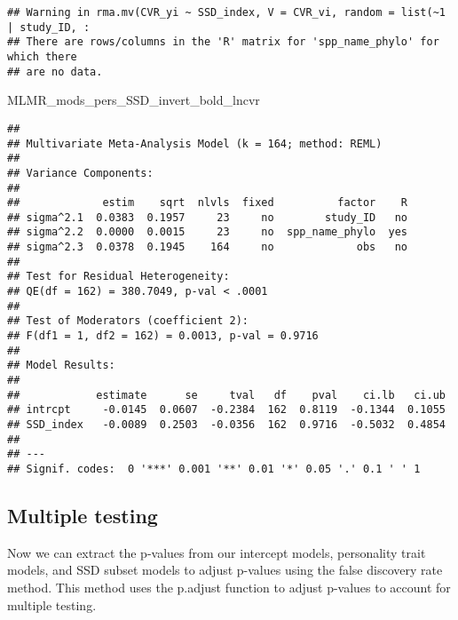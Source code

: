 \documentclass[]{article}
\newenvironment{Shaded}{\begin{snugshade}}{\end{snugshade}}
\newcommand{\NormalTok}[1]{#1}
\begin{document}
\begin{verbatim}
## Warning in rma.mv(CVR_yi ~ SSD_index, V = CVR_vi, random = list(~1 | study_ID, :
## There are rows/columns in the 'R' matrix for 'spp_name_phylo' for which there
## are no data.
\end{verbatim}

\begin{Shaded}
\begin{Highlighting}[]
\NormalTok{    MLMR_mods_pers_SSD_invert_bold_lncvr}
\end{Highlighting}
\end{Shaded}

\begin{verbatim}
## 
## Multivariate Meta-Analysis Model (k = 164; method: REML)
## 
## Variance Components:
## 
##             estim    sqrt  nlvls  fixed          factor    R 
## sigma^2.1  0.0383  0.1957     23     no        study_ID   no 
## sigma^2.2  0.0000  0.0015     23     no  spp_name_phylo  yes 
## sigma^2.3  0.0378  0.1945    164     no             obs   no 
## 
## Test for Residual Heterogeneity:
## QE(df = 162) = 380.7049, p-val < .0001
## 
## Test of Moderators (coefficient 2):
## F(df1 = 1, df2 = 162) = 0.0013, p-val = 0.9716
## 
## Model Results:
## 
##            estimate      se     tval   df    pval    ci.lb   ci.ub 
## intrcpt     -0.0145  0.0607  -0.2384  162  0.8119  -0.1344  0.1055    
## SSD_index   -0.0089  0.2503  -0.0356  162  0.9716  -0.5032  0.4854    
## 
## ---
## Signif. codes:  0 '***' 0.001 '**' 0.01 '*' 0.05 '.' 0.1 ' ' 1
\end{verbatim}

\subsection{Multiple testing}\label{multiple-testing}

Now we can extract the p-values from our intercept models, personality
trait models, and SSD subset models to adjust p-values using the false
discovery rate method. This method uses the p.adjust function to adjust
p-values to account for multiple testing.
\end{document}
